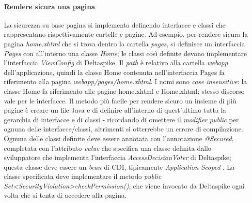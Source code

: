 \paragraph{Rendere sicura una pagina} 
La sicurezza su base pagina si implementa definendo interfacce e classi che rappresentano rispettivamente cartelle e pagine. Ad esempio, per rendere sicura la pagina \textsl{home.xhtml} che si trova dentro la cartella \textsl{pages}, si definisce un interfaccia \textsl{Pages} con all'interno una classe \textsl{Home}; le classi così definite devono implementare l'interfaccia \textsl{ViewConfig} di Deltaspike. Il \textit{path} è relativo alla cartella \textsl{webapp} dell'applicazione, quindi la classe Home contenuta nell'interfaccia Pages fa riferimento alla pagina \textsl{webapp/pages/home.xhtml}. I nomi sono \textit{case insensitive}: la classe Home fa riferimento alle pagine home.xhtml e Home.xhtml; stesso discorso vale per le interfacce.\newline
Il metodo più facile per rendere sicuro un insieme di più pagine è creare un file Java e di definire all'interno di quest'ultimo tutta la gerarchia di interfacce e di classi - ricordando di omettere il \textit{modifier} \textsl{public} per ognuna delle interfacce/classi, altrimenti si otterrebbe un errore di compilazione.\newline
Ognuna delle classi definite deve essere annotata con l'annotazione \textsl{@Secured}, completata con l'attributo \textsl{value} che specifica una classe definita dallo sviluppatore che implementa l'interfaccia \textsl{AccessDecisionVoter} di Deltaspike; questa classe deve essere un \textit{bean} di CDI, tipicamente \textsl{Application Scoped} .
La classe specificata deve implementare il metodo \textsl{public Set\textless SecurityViolation\textgreater \space checkPermission()}, che viene invocato da Deltaspike ogni volta che si tenta di accedere alla pagina.\newline
